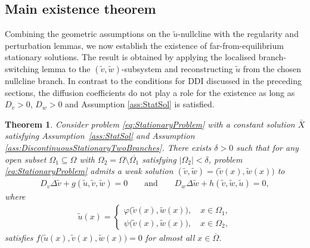\documentclass[12pt, a4paper]{amsart}
\numberwithin{equation}{section}
\newcommand{\CSS}{\bar{X}}
\newcommand{\Nun}{\tilde{\un}}
\newcommand{\Nus}{\tilde{\us}}
\newcommand{\Nuf}{\tilde{\uf}}
\newcommand{\un}{u}
\newcommand{\us}{v}
\newcommand{\uf}{w}
\newcommand{\Ds}{D_v}
\newcommand{\Df}{D_w}
\newcommand{\fn}{f}
\newcommand{\fs}{g}
\newcommand{\ffa}{h}
\newenvironment{nalign}
{\begin{equation}\begin{aligned}}
		{\end{aligned}\end{equation}\ignorespacesafterend}
\newtheorem{theorem}{\bf Theorem}[section]
\begin{document}
\subsection{Main existence theorem} Combining the geometric assumptions on the $\Nun$-nullcline with the regularity and perturbation lemmas, we now establish the existence of far-from-equilibrium stationary solutions.
The result is obtained by applying the localised branch-switching lemma to the $(\Nus,\Nuf)$-subsystem and reconstructing $\Nun$ from the chosen nullcline branch.
In contrast to the conditions for DDI discussed in the preceding sections, the diffusion coefficients do not play a role for the existence as long as $D_v>0$, $D_w>0$ and Assumption \ref{ass:StatSol} is satisfied.

\begin{theorem}
	\label{DisExBan}
    Consider problem \eqref{eq:StationaryProblem} with a constant solution $\CSS$ satisfying Assumption~\ref{ass:StatSol} and Assumption \ref{ass:DiscontinuousStationaryTwoBranches}.
    There exists $\delta>0$ such that for any open subset $\Omega_1\subseteq\Omega$ with $\Omega_2 = \Omega \setminus \overline{\Omega_1}$ satisfying $|\Omega_2|< \delta$, problem \eqref{eq:StationaryProblem} admits a weak solution $(\Nus,\Nuf)= \big(\Nus(x),\Nuf(x)\big)$ to
		\begin{nalign}
			\label{eq:DinsontinousSolutionsVEquation}
			\Ds \Delta \Nus + \fs(\Nun, \Nus, \Nuf) = 0 \qquad \text{and} \qquad \Df \Delta \Nuf + \ffa(\Nus, \Nuf, \Nun) = 0, 
		\end{nalign}
		where
		\begin{nalign}
			\label{Uform}
			\Nun(x) = \begin{cases}
				\varphi\big(\Nus(x), \Nuf(x)\big), \quad x\in \Omega_1, \\
				\psi\big(\Nus(x), \Nuf(x)\big), \quad x\in \Omega_2,
			\end{cases}
		\end{nalign} 
		satisfies $\fn\big(\Nun(x),\Nus(x), \Nuf(x)\big) = 0$ for almost all $x\in \overline{\Omega}$. 
\end{theorem}
\end{document}
